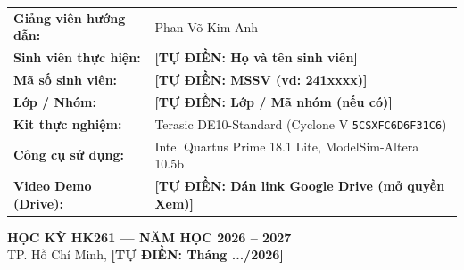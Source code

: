 \documentclass[11pt,a4paper]{article}
\newcommand{\todo}[1]{%
  \colorbox{todoBg}{\textcolor{todoRed}{\textbf{[TỰ ĐIỀN: #1]}}}%
}
\newcommand{\code}[1]{\texttt{\small #1}}
\begin{document}
\begin{titlepage}
  \vspace{1.4cm}

  \begin{minipage}{0.88\linewidth}
    \renewcommand{\arraystretch}{1.45}
    \begin{tabularx}{\linewidth}{@{}p{4.5cm} X@{}}
      \textbf{Giảng viên hướng dẫn:} & Phan Võ Kim Anh \\
      \textbf{Sinh viên thực hiện:}  & \todo{Họ và tên sinh viên} \\
      \textbf{Mã số sinh viên:}      & \todo{MSSV (vd: 241xxxx)} \\
      \textbf{Lớp / Nhóm:}           & \todo{Lớp / Mã nhóm (nếu có)} \\
      \textbf{Kit thực nghiệm:}      & Terasic DE10-Standard (Cyclone V \code{5CSXFC6D6F31C6}) \\
      \textbf{Công cụ sử dụng:}      & Intel Quartus Prime 18.1 Lite, ModelSim-Altera 10.5b \\
      \textbf{Video Demo (Drive):}   & \todo{Dán link Google Drive (mở quyền Xem)} \\
    \end{tabularx}
  \end{minipage}

  \vfill
  {\normalsize\bfseries HỌC KỲ HK261 --- NĂM HỌC 2026 -- 2027}\\[4pt]
  {\normalsize TP. Hồ Chí Minh, \todo{Tháng .../2026}}
  \vspace*{0.4cm}
\end{titlepage}

\setcounter{page}{2}
{\small
  \renewcommand{\contentsname}{MỤC LỤC}
  \tableofcontents
}
\vspace{0.5cm}
\end{document}
